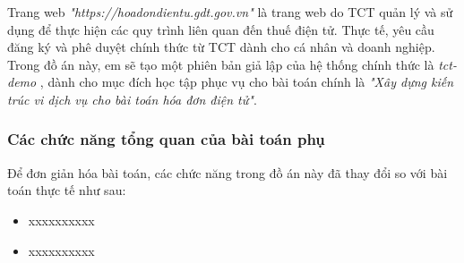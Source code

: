 Trang web \emph{"https://hoadondientu.gdt.gov.vn"} là trang web do TCT quản lý và sử dụng để thực hiện các quy trình liên quan đến thuế điện tử. Thực tế, yêu cầu đăng ký và phê duyệt chính thức từ TCT dành cho cá nhân và doanh nghiệp. Trong đồ án này, em sẽ tạo một phiên bản giả lập của hệ thống chính thức là \emph{tct-demo} , dành cho mục đích học tập phục vụ cho bài toán chính là \emph{"Xây dựng kiến trúc vi dịch vụ cho bài toán hóa đơn điện tử"}.



\subsubsection{Các chức năng tổng quan của bài toán phụ}
Để đơn giản hóa bài toán, các chức năng trong đồ án này đã thay đổi so với bài toán thực tế như sau:

\begin{itemize}

\item xxxxxxxxxx

\item xxxxxxxxxx

\end{itemize}












% 





